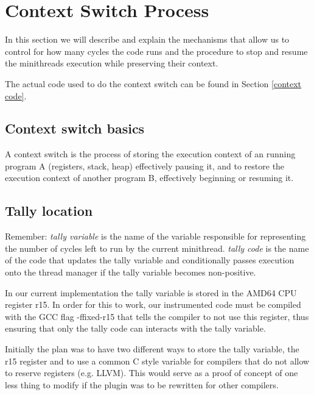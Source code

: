 \documentclass[12pt,a4paper]{report}
\begin{document}
\section{Context Switch Process}
In this section we will describe and explain the mechanisms that allow us to control for how many cycles the code runs and the procedure to stop and resume the minithread\textquotesingle s execution while preserving their context.


The actual code used to do the context switch can be found in Section \ref{context code}.

\subsection{Context switch basics}
A context switch is the process of storing the execution context of an running program A (registers, stack, heap) effectively pausing it, and to restore the execution context of another program B, effectively beginning or resuming it.


\subsection{Tally location}
Remember: \textit{tally variable} is the name of the variable responsible for representing the number of cycles left to run by the current minithread. \textit{tally code} is the name of the code that updates the tally variable and conditionally passes execution onto the thread manager if the tally variable becomes non-positive.

In our current implementation the tally variable is stored in the AMD64 CPU register r15. In order for this to work, our instrumented code must be compiled with the GCC flag -ffixed-r15 that tells the compiler to not use this register, thus ensuring that only the tally code can interacts with the tally variable.

Initially the plan was to have two different ways to store the tally variable, the r15 register and to use a common C style variable for compilers that do not allow to reserve registers (e.g. LLVM). This would serve as a proof of concept of one less thing to modify if the plugin was to be rewritten for other compilers. 
\end{document}
